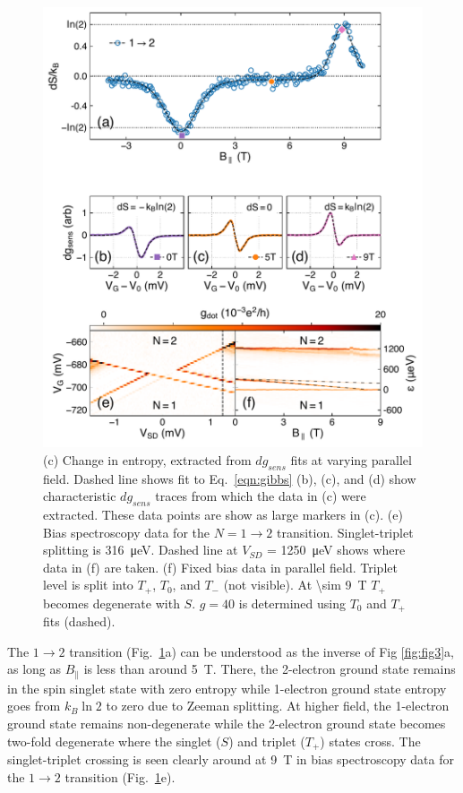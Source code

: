 \documentclass[twocolumn,showpacs,preprintnumbers,amsmath,amssymb,pra,aps,superscriptaddress]{revtex4-1}
\begin{document}
\begin{figure}
        \includegraphics[width=1.0\columnwidth]{../figures/figure_4.pdf}
        \caption{\label{fig:fig4}(c) Change in entropy, extracted from $dg_{sens}$ fits at varying parallel field. Dashed line shows fit to Eq.~\ref{eqn:gibbs} (b), (c), and (d) show characteristic $dg_{sens}$ traces from which the data in (c) were extracted. These data points are show as large markers in (c). (e) Bias spectroscopy data for the $N=1 \rightarrow 2$ transition. Singlet-triplet splitting is \SI{316}{\micro\electronvolt}. Dashed line at $V_{SD}$ = \SI{1250}{\micro\electronvolt} shows where data in (f) are taken. (f) Fixed bias data in parallel field. Triplet level is split into $T_+$, $T_0$, and $T_{-}$ (not visible). At \SI[input-protect-tokens]{\sim 9}{\tesla} $T_+$ becomes degenerate with $S$. $g=40$ is determined using $T_0$ and $T_+$ fits (dashed).}
\end{figure}

The $1\rightarrow 2$ transition (Fig.~\ref{fig:fig4}a) can be understood as the inverse of Fig \ref{fig:fig3}a, as long as $B_\parallel$ is less than around \SI{5}{\tesla}.  There, the 2-electron ground state remains in the spin singlet state with zero entropy while 1-electron ground state entropy goes from $k_B\ln{2}$ to zero due to Zeeman splitting. At higher field, the 1-electron ground state remains non-degenerate while the 2-electron ground state becomes two-fold degenerate where the singlet ($S$) and triplet ($T_+$) states cross. The singlet-triplet crossing is seen clearly around at \SI{9}{\tesla} in bias spectroscopy data for the $1\rightarrow 2$ transition (Fig.~\ref{fig:fig4}e). 
\end{document}
